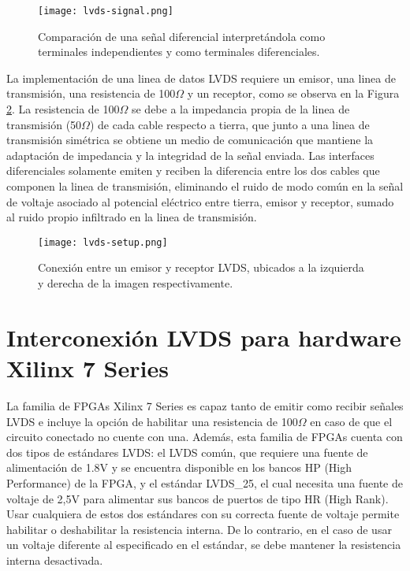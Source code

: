 	\begin{figure}[ht]
		\centering
		\texttt{[image: lvds-signal.png]}
		\caption{Comparación de una señal diferencial interpretándola como terminales independientes y como terminales diferenciales.}
		\label{fig:lvds-signal}
	\end{figure}
	
	La implementación de una linea de datos LVDS requiere un emisor, una linea de transmisión, una resistencia de 100$\Omega$ y un receptor, como se observa en la Figura \ref{fig:lvds-setup}. La resistencia de 100$\Omega$ se debe a la impedancia propia de la linea de transmisión (50$\Omega$) de cada cable respecto a tierra, que junto a una linea de transmisión simétrica se obtiene un medio de comunicación que mantiene la adaptación de impedancia y la integridad de la señal enviada. Las interfaces diferenciales solamente emiten y reciben la diferencia entre los dos cables que componen la linea de transmisión, eliminando el ruido de modo común en la señal de voltaje asociado al potencial eléctrico entre tierra, emisor y receptor, sumado al ruido propio infiltrado en la linea de transmisión.
	
	
	\begin{figure}[ht]
		\centering
		\texttt{[image: lvds-setup.png]}
		\caption{Conexión entre un emisor y receptor LVDS, ubicados a la izquierda y derecha de la imagen respectivamente\cite{Xilinx7UG471}.}
		\label{fig:lvds-setup}
	\end{figure}


\section{Interconexión LVDS para hardware Xilinx 7 Series}

	La familia de FPGAs Xilinx 7 Series\cite{Xilinx20147Guide} es capaz tanto de emitir como recibir señales LVDS e incluye la opción de habilitar una resistencia de 100$\Omega$ en caso de que el circuito conectado no cuente con una. Además, esta familia de FPGAs cuenta con dos tipos de estándares LVDS\cite{Xilinx2011Artix-7Characteristics}: el LVDS común, que requiere una fuente de alimentación de 1.8V y se encuentra disponible en los bancos HP (High Performance) de la FPGA, y el estándar LVDS\_25, el cual necesita una fuente de voltaje de 2,5V para alimentar sus bancos de puertos de tipo HR (High Rank). Usar cualquiera de estos dos estándares con su correcta fuente de voltaje permite habilitar o deshabilitar la resistencia interna. De lo contrario, en el caso de usar un voltaje diferente al especificado en el estándar, se debe mantener la resistencia interna desactivada\cite{Xilinx7Banks}.
	
